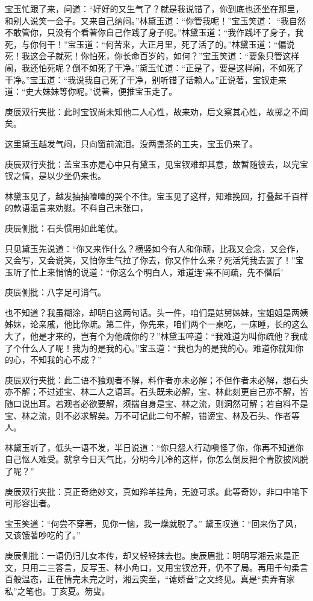\begin{parag}


    宝玉忙跟了来，问道：“好好的又生气了？就是我说错了，你到底也还坐在那里，和别人说笑一会子。又来自己纳闷。”林黛玉道：“你管我呢！”宝玉笑道： “我自然不敢管你，只没有个看著你自己作践了身子呢。”林黛玉道：“我作践坏了身子，我死，与你何干！”宝玉道：“何苦来，大正月里，死了活了的。”林黛玉道：“偏说死！我这会子就死！你怕死，你长命百岁的，如何？”宝玉笑道：“要象只管这样闹，我还怕死呢？倒不如死了干净。”黛玉忙道：“正是了，要是这样闹，不如死了干净。”宝玉道：“我说我自己死了干净，别听错了话赖人。”正说著，宝钗走来道：“史大妹妹等你呢。”说著，便推宝玉走了。\begin{note}庚辰双行夹批：此时宝钗尚未知他二人心性，故来劝，后文察其心性，故掷之不闻矣。\end{note}这里黛玉越发气闷，只向窗前流泪。没两盏茶的工夫，宝玉仍来了。\begin{note}庚辰双行夹批：盖宝玉亦是心中只有黛玉，见宝钗难却其意，故暂随彼去，以完宝钗之情，是以少坐仍来也。\end{note}林黛玉见了，越发抽抽噎噎的哭个不住。宝玉见了这样，知难挽回，打叠起千百样的款语温言来劝慰。不料自己未张口，\begin{note}庚辰侧批：石头惯用如此笔仗。\end{note}只见黛玉先说道：“你又来作什么？横竖如今有人和你顽，比我又会念，又会作，又会写，又会说笑，又怕你生气拉了你去，你又作什么来？死活凭我去罢了！”宝玉听了忙上来悄悄的说道：“你这么个明白人，难道连‘亲不间疏，先不僭后’\begin{note}庚辰侧批：八字足可消气。\end{note}也不知道？我虽糊涂，却明白这两句话。头一件，咱们是姑舅姊妹，宝姐姐是两姨姊妹，论亲戚，他比你疏。第二件，你先来，咱们两个一桌吃，一床睡，长的这么大了，他是才来的，岂有个为他疏你的？”林黛玉啐道：“我难道为叫你疏他？我成了个什么人了呢！我为的是我的心。”宝玉道：“我也为的是我的心。难道你就知你的心，不知我的心不成？”\begin{note}庚辰双行夹批：此二语不独观者不解，料作者亦未必解；不但作者未必解，想石头亦不解；不过述宝、林二人之语耳。石头既未必解，宝、林此刻更自己亦不解，皆随口说出耳。若观者必欲要解，须揣自身是宝、林之流，则洞然可解；若自料不是宝、林之流，则不必求解矣。万不可记此二句不解，错谤宝、林及石头、作者等人。\end{note}林黛玉听了，低头一语不发，半日说道：“你只怨人行动嗔怪了你，你再不知道你自己怄人难受。就拿今日天气比，分明今儿冷的这样，你怎么倒反把个青肷披风脱了呢？”\begin{note}庚辰双行夹批：真正奇绝妙文，真如羚羊挂角，无迹可求。此等奇妙，非口中笔下可形容出者。\end{note}宝玉笑道：“何尝不穿著，见你一恼，我一燥就脱了。” 黛玉叹道：“回来伤了风，又该饿著吵吃的了。”\begin{note}庚辰侧批：一语仍归儿女本传，却又轻轻抹去也。庚辰眉批：明明写湘云来是正文，只用二三答言，反写玉、林小角口，又用宝钗岔开，仍不了局。再用千句柔言百般温态，正在情完未完之时，湘云突至，“谑娇音”之文终见。真是“卖弄有家私”之笔也。丁亥夏。笏叟。\end{note}
\end{parag}


